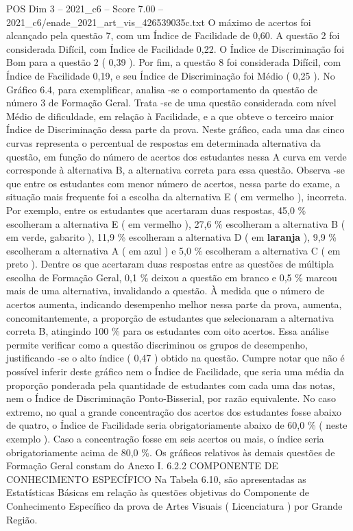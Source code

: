 \begin{textsample}{POS Dim 3 – 2021\_c6 – Score 7.00 – 2021\_c6/enade\_2021\_art\_vis\_426539035c.txt}
O máximo de acertos foi alcançado pela questão 7, com um Índice de Facilidade de 0,60.
A questão 2 foi considerada Difícil, com Índice de Facilidade 0,22.
O Índice de Discriminação foi Bom para a questão 2 ( 0,39 ).
Por fim, a questão 8 foi considerada Difícil, com Índice de Facilidade 0,19, e seu Índice de Discriminação foi Médio ( 0,25 ).
No Gráfico 6.4, para exemplificar, analisa -se o comportamento da questão de número 3 de Formação Geral.
Trata -se de uma questão considerada com nível Médio de dificuldade, em relação à Facilidade, e a que obteve o terceiro maior Índice de Discriminação dessa parte da prova.
Neste gráfico, cada uma das cinco curvas representa o percentual de respostas em determinada alternativa da questão, em função do número de acertos dos estudantes nessa A curva em verde corresponde à alternativa B, a alternativa correta para essa questão.
Observa -se que entre os estudantes com menor número de acertos, nessa parte do exame, a situação mais frequente foi a escolha da alternativa E ( em vermelho ), incorreta.
Por exemplo, entre os estudantes que acertaram duas respostas, 45,0 \% escolheram a alternativa E ( em vermelho ), 27,6 \% escolheram a alternativa B ( em verde, gabarito ), 11,9 \% escolheram a alternativa D ( em \textbf{laranja} ), 9,9 \% escolheram a alternativa A ( em azul ) e 5,0 \% escolheram a alternativa C ( em preto ).
Dentre os que acertaram duas respostas entre as questões de múltipla escolha de Formação Geral, 0,1 \% deixou a questão em branco e 0,5 \% marcou mais de uma alternativa, invalidando a questão.
À medida que o número de acertos aumenta, indicando desempenho melhor nessa parte da prova, aumenta, concomitantemente, a proporção de estudantes que selecionaram a alternativa correta B, atingindo 100 \% para os estudantes com oito acertos.
Essa análise permite verificar como a questão discriminou os grupos de desempenho, justificando -se o alto índice ( 0,47 ) obtido na questão.
Cumpre notar que não é possível inferir deste gráfico nem o Índice de Facilidade, que seria uma média da proporção ponderada pela quantidade de estudantes com cada uma das notas, nem o Índice de Discriminação Ponto-Bisserial, por razão equivalente.
No caso extremo, no qual a grande concentração dos acertos dos estudantes fosse abaixo de quatro, o Índice de Facilidade seria obrigatoriamente abaixo de 60,0 \% ( neste exemplo ).
Caso a concentração fosse em seis acertos ou mais, o índice seria obrigatoriamente acima de 80,0 \%.
Os gráficos relativos às demais questões de Formação Geral constam do Anexo I. 6.2.2 COMPONENTE DE CONHECIMENTO ESPECÍFICO Na Tabela 6.10, são apresentadas as Estatísticas Básicas em relação às questões objetivas do Componente de Conhecimento Específico da prova de Artes Visuais ( Licenciatura ) por Grande Região.

\end{textsample}

